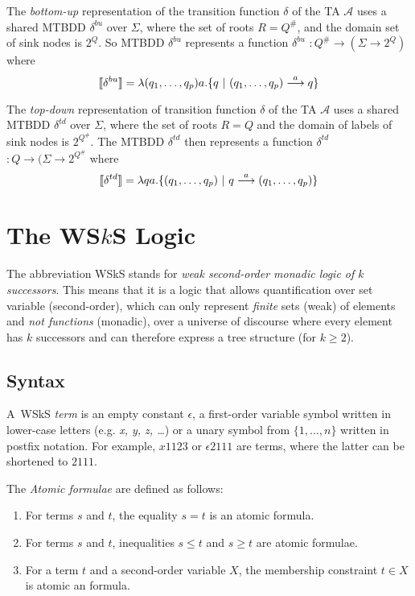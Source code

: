 The \emph{bottom-up} representation of the transition function $\delta$ of the TA $\mathcal{A}$ uses a shared MTBDD $\delta^{bu}$ over $\Sigma$, where the set of roots $R = Q^\#$, and the domain set of sink nodes is $2^Q$. So MTBDD $\delta^{bu}$ represents a function \textlbrackdbl $\delta^{bu}$ \textrbrackdbl $: Q^\# \rightarrow (\Sigma \rightarrow 2^Q)$ where
 $$\text{\textlbrackdbl} \delta^{bu} \text{\textrbrackdbl} = \lambda (q_1,\ldots,q_p) a . \{q\ |\ (q_1,\ldots,q_p) \overset{a}{\longrightarrow} q\} $$

The \emph{top-down} representation of transition function $\delta$ of the TA $\mathcal{A}$ uses a shared MTBDD $\delta^{td}$ over $\Sigma$, where the set of roots $R = Q$ and the domain of labels of sink nodes is $2^{Q^\#}$. The MTBDD $\delta^{td}$ then represents a function \textlbrackdbl $\delta^{td}$ \textrbrackdbl $: Q \rightarrow (\Sigma \rightarrow 2^{Q^\#}$ where $$\text{\textlbrackdbl} \delta^{td} \text{\textrbrackdbl} = \lambda q a . \{(q_1,\ldots,q_p)\ |\ q \overset{a}{\longrightarrow} (q_1,\ldots,q_p)\}$$

\chapter{The WS$k$S Logic}\label{wsks}
The abbreviation WSkS stands for \emph{weak second-order monadic logic of $k$ successors}. This means that it is a logic that allows quantification over set variable (second-order), which can only represent \emph{finite} sets (weak) of elements and \emph{not functions} (monadic), over a universe of discourse where every element has $k$ successors and can therefore express a tree structure (for $k \geq 2$).
 
 \section{Syntax}
 A~WSkS \emph{term} is an empty constant $\epsilon$, a first-order variable symbol written in lower-case letters (e.g. \emph{x, y, z,
 \ldots}) or a unary symbol from $\{1,\ldots,n\}$ written in postfix notation. For example, $x1123$ or $\epsilon2111$ are terms, where the latter can be shortened to $2111$.

The \emph{Atomic formulae} are defined as follows:
 \begin{enumerate}
  \item For terms $s$ and $t$, the equality $s = t$ is an atomic formula.
	\item For terms $s$ and $t$, inequalities $s \leq t$ and $s \geq t$ are atomic formulae.
	\item For a term $t$ and a second-order variable $X$, the membership constraint $t \in X$ is atomic an formula.
 \end{enumerate}

